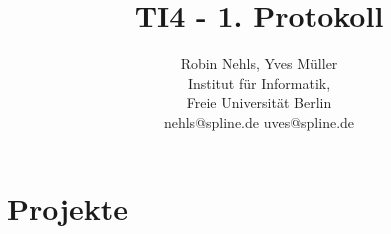 \documentclass[11pt,a4paper,onecolumn]{report}
\title{TI4 - 1. Protokoll}
\author{Robin Nehls, Yves M\"uller\\
  Institut f\"ur Informatik,\\
  Freie Universit\"at Berlin\\
  nehls@spline.de uves@spline.de }
\date{}
\begin{document}
\maketitle
\tableofcontents




















\chapter{Projekte}
\end{document}
